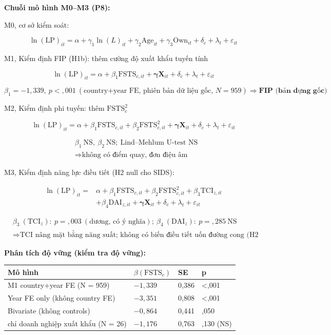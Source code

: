 \documentclass[
  a4paper,
  13pt]{extreport}
\begin{document}
\textbf{Chuỗi mô hình M0--M3 (P8):}

M0, cơ sở kiểm soát:

\[\ln(\mathrm{LP})_{it} = \alpha + \gamma_1 \ln(L)_{it} + \gamma_2 \mathrm{Age}_{it} + \gamma_3 \mathrm{Own}_{it} + \delta_c + \lambda_t + \varepsilon_{it}\]

M1, Kiểm định FIP (H1b): thêm cường độ xuất khẩu tuyến tính

\[\ln(\mathrm{LP})_{it} = \alpha + \beta_1 \mathrm{FSTS}_{c,it} + \boldsymbol{\gamma}\mathbf{X}_{it} + \delta_c + \lambda_t + \varepsilon_{it}\]

\[\beta_1 = -1{,}339,\ p < {,}001\ (\text{country+year FE, phiên bản dữ liệu gốc, } N = 959) \Rightarrow \textbf{FIP (bản dựng gốc)}\]

M2, Kiểm định phi tuyến: thêm \(\mathrm{FSTS}_{c}^{2}\)

\[\ln(\mathrm{LP})_{it} = \alpha + \beta_1 \mathrm{FSTS}_{c,it} + \beta_2 \mathrm{FSTS}_{c,it}^{2} + \boldsymbol{\gamma}\mathbf{X}_{it} + \delta_c + \lambda_t + \varepsilon_{it}\]

\[\begin{aligned}
& \beta_1\ \text{NS},\ \beta_2\ \text{NS};\ \text{Lind–Mehlum U-test NS} \\
& \Rightarrow \text{không có điểm quay, đơn điệu âm}
\end{aligned}\]

M3, Kiểm định năng lực điều tiết (H2 null cho SIDS):

\[\begin{aligned}
\ln(\mathrm{LP})_{it} = {} & \alpha + \beta_1 \mathrm{FSTS}_{c,it} + \beta_2 \mathrm{FSTS}_{c,it}^{2} + \beta_3 \mathrm{TCI}_{z,it} \\
& + \beta_4 \mathrm{DAI}_{z,it} + \boldsymbol{\gamma}\mathbf{X}_{it} + \delta_c + \lambda_t + \varepsilon_{it}
\end{aligned}\]

\[\begin{aligned}
& \beta_3\ (\mathrm{TCI}_{z}):\ p = {,}003\ (\text{dương, có ý nghĩa});\ \beta_4\ (\mathrm{DAI}_{z}):\ p = {,}285\ \text{NS} \\
& \Rightarrow \text{TCI nâng mặt bằng năng suất; không có biến điều tiết uốn đường cong (H2 null)}
\end{aligned}\]

\textbf{Phân tích độ vững (kiểm tra độ vững):}

\begin{longtable}[]{@{}llll@{}}
\toprule\noalign{}
Mô hình & \(\beta(\mathrm{FSTS}_c)\) & SE & p \\
\midrule\noalign{}
\endhead
\bottomrule\noalign{}
\endlastfoot
M1 country+year FE (N = 959) & \(-1{,}339\) & 0,386 & \textless,001 \\
Year FE only (không country FE) & \(-3{,}351\) & 0,808 &
\textless,001 \\
Bivariate (không controls) & \(-0{,}864\) & 0,441 & ,050 \\
chỉ doanh nghiệp xuất khẩu (N = 26) & \(-1{,}176\) & 0,763 & ,130
(NS) \\
\end{longtable}
\end{document}
